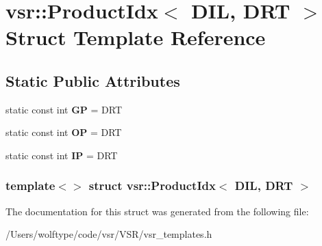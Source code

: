 \hypertarget{structvsr_1_1_product_idx_3_01_d_i_l_00_01_d_r_t_01_4}{\section{vsr\-:\-:Product\-Idx$<$ D\-I\-L, D\-R\-T $>$ Struct Template Reference}
\label{structvsr_1_1_product_idx_3_01_d_i_l_00_01_d_r_t_01_4}
}
\subsection*{Static Public Attributes}
\begin{DoxyCompactItemize}
\item 
\hypertarget{structvsr_1_1_product_idx_3_01_d_i_l_00_01_d_r_t_01_4_a607e73cb69e777cd2bc93b48097d4055}{static const int {\bfseries G\-P} = D\-R\-T}\label{structvsr_1_1_product_idx_3_01_d_i_l_00_01_d_r_t_01_4_a607e73cb69e777cd2bc93b48097d4055}

\item 
\hypertarget{structvsr_1_1_product_idx_3_01_d_i_l_00_01_d_r_t_01_4_a8a308d4a6b643dc80cc8800ee2541087}{static const int {\bfseries O\-P} = D\-R\-T}\label{structvsr_1_1_product_idx_3_01_d_i_l_00_01_d_r_t_01_4_a8a308d4a6b643dc80cc8800ee2541087}

\item 
\hypertarget{structvsr_1_1_product_idx_3_01_d_i_l_00_01_d_r_t_01_4_a97c184efb1d76c5035f691a84f12c4b0}{static const int {\bfseries I\-P} = D\-R\-T}\label{structvsr_1_1_product_idx_3_01_d_i_l_00_01_d_r_t_01_4_a97c184efb1d76c5035f691a84f12c4b0}

\end{DoxyCompactItemize}
\subsubsection*{template$<$$>$ struct vsr\-::\-Product\-Idx$<$ D\-I\-L, D\-R\-T $>$}



The documentation for this struct was generated from the following file\-:\begin{DoxyCompactItemize}
\item 
/\-Users/wolftype/code/vsr/\-V\-S\-R/vsr\-\_\-templates.\-h\end{DoxyCompactItemize}
